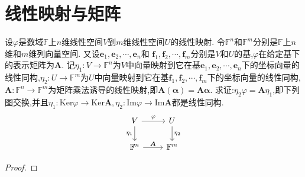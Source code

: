 \documentclass[../../main.tex]{subfiles}
\begin{document}
\section{线性映射与矩阵}

\begin{theorem}\label{theorem:线性映射与矩阵基本定理}
设\(\varphi\)是数域\(\mathbb{F}\)上\(n\)维线性空间\(V\)到\(m\)维线性空间\(U\)的线性映射. 令\(\mathbb{F}^n\)和\(\mathbb{F}^m\)分别是\(\mathbb{F}\)上\(n\)维和\(m\)维列向量空间. 又设\(\boldsymbol{e}_1,\boldsymbol{e}_2,\cdots,\boldsymbol{e}_n\)和
\(\boldsymbol{f}_1,\boldsymbol{f}_2,\cdots,\boldsymbol{f}_m\)分别是\(V\)和\(U\)的基,\(\varphi\)在给定基下的表示矩阵为\(\boldsymbol{A}\). 记\(\eta_1:V\to\mathbb{F}^n\)为\(V\)中向量映射到它在基\(\boldsymbol{e}_1,\boldsymbol{e}_2,\cdots,\boldsymbol{e}_n\)下的坐标向量的线性同构,\(\eta_2:U\to\mathbb{F}^m\)为\(U\)中向量映射到它在基\(\boldsymbol{f}_1,\boldsymbol{f}_2,\cdots,\boldsymbol{f}_m\)下的坐标向量的线性同构,\(\boldsymbol{A}:\mathbb{F}^n\to\mathbb{F}^m\)为矩阵乘法诱导的线性映射,即\(\boldsymbol{A}(\boldsymbol{\alpha})=\boldsymbol{A}\boldsymbol{\alpha}\). 求证:\(\eta_2\varphi=\boldsymbol{A}\eta_1\),即下列图交换,并且\(\eta_1:\text{Ker}\varphi\to\text{Ker}\boldsymbol{A},\eta_2:\text{Im}\varphi\to\text{Im}\boldsymbol{A}\)都是线性同构.
\[\begin{tikzcd}
V \arrow[r, "\varphi"] \arrow[d, "\eta_1"'] & U \arrow[d, "\eta_2"] \\
\mathbb{F}^n \arrow[r, "\boldsymbol{A}"]    & \mathbb{F}^m         
\end{tikzcd}
\]
\end{theorem}
\begin{proof}


\end{proof}
\end{document}
